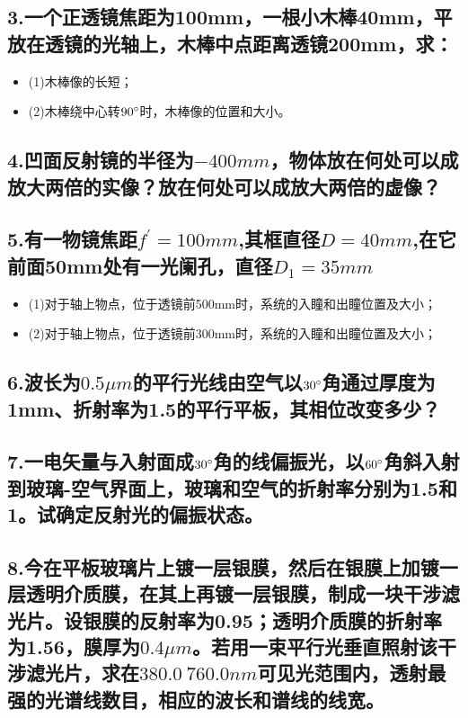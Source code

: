 \documentclass[11pt,a4paper]{article}
\begin{document}
    \subsection*{3.一个正透镜焦距为100mm，一根小木棒40mm，平放在透镜的光轴上，木棒中点距离透镜200mm，求：}
    \begin{itemize}
        \vspace{0mm}
        \item (1)木棒像的长短；
        \vspace{0mm}
        \item (2)木棒绕中心转$90\degree $时，木棒像的位置和大小。
    \end{itemize}
    \vspace{20mm}
    \subsection*{4.凹面反射镜的半径为$-400mm$，物体放在何处可以成放大两倍的实像？放在何处可以成放大两倍的虚像？}
    \vspace{20mm}
    \subsection*{5.有一物镜焦距$f^{'}=100mm$,其框直径$D=40mm$,在它前面50mm处有一光阑孔，直径$D_1=35mm$}
    \begin{itemize}
        \vspace{0mm}
        \item (1)对于轴上物点，位于透镜前500mm时，系统的入瞳和出瞳位置及大小；
        \vspace{0mm}
        \item (2)对于轴上物点，位于透镜前300mm时，系统的入瞳和出瞳位置及大小；
    \end{itemize}
    \vspace{20mm}
    \subsection*{6.波长为$0.5\mu m$的平行光线由空气以$30\degree$角通过厚度为1mm、折射率为1.5的平行平板，其相位改变多少？}
    \vspace{20mm}
    \subsection*{7.一电矢量与入射面成$30\degree$角的线偏振光，以$60\degree$角斜入射到玻璃-空气界面上，玻璃和空气的折射率分别为1.5和1。试确定反射光的偏振状态。}
    \vspace{20mm}
    \subsection*{8.今在平板玻璃片上镀一层银膜，然后在银膜上加镀一层透明介质膜，在其上再镀一层银膜，制成一块干涉滤光片。设银膜的反射率为0.95；透明介质膜的折射率为1.56，膜厚为$0.4\mu m$。若用一束平行光垂直照射该干涉滤光片，求在$380.0~760.0nm$可见光范围内，透射最强的光谱线数目，相应的波长和谱线的线宽。}
    \vspace{20mm}
\end{document}
